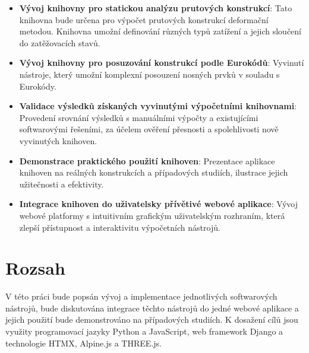 \begin{itemize}
    \item \textbf{Vývoj knihovny pro statickou analýzu prutových konstrukcí}: Tato knihovna bude určena pro výpočet prutových konstrukcí deformační metodou. Knihovna umožní definování různých typů zatížení a jejich sloučení do zatěžovacích stavů.
\item \textbf{Vývoj knihovny pro posuzování konstrukcí podle Eurokódů}: Vyvinutí nástroje, který umožní komplexní posouzení nosných prvků v souladu s Eurokódy.
\item \textbf{Validace výsledků získaných vyvinutými výpočetními knihovnami}: Provedení srovnání výsledků s manuálními výpočty a existujícími softwarovými řešeními, za účelem ověření přesnosti a spolehlivosti nově vyvinutých knihoven.
\item \textbf{Demonstrace praktického použití knihoven}: Prezentace aplikace knihoven na reálných konstrukcích a případových studiích, ilustrace jejich užitečnosti a efektivity.
\item \textbf{Integrace knihoven do uživatelsky přívětivé webové aplikace}: Vývoj webové platformy s intuitivním grafickým uživatelským rozhraním, která zlepší přístupnost a interaktivitu výpočetních nástrojů.
\end{itemize}


\section*{Rozsah}
V této práci bude popsán vývoj a implementace jednotlivých softwarových nástrojů, bude diskutována integrace těchto nástrojů do jedné webové aplikace a jejich použití bude demonstrováno na případových studiích. K dosažení cílů jsou využity programovací jazyky Python a JavaScript, web framework Django a technologie HTMX, Alpine.js a THREE.js.

